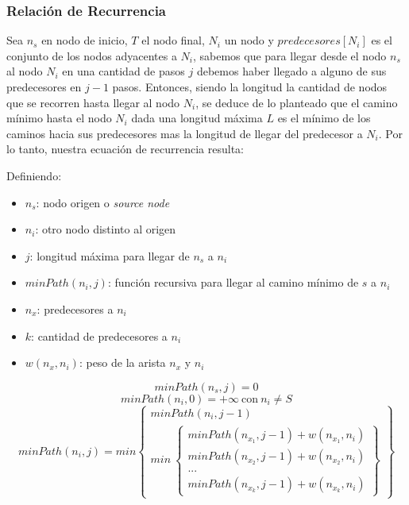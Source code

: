\documentclass[titlepage,a4paper]{article}
\begin{document}
\subsubsection{Relación de Recurrencia}
\label{sec:org209b31c}

Sea \(n_s\) en nodo de inicio, \(T\) el nodo final, \(N_i\) un nodo y \(predecesores[N_i]\) es el
conjunto de los nodos adyacentes a \(N_i\), sabemos que para llegar desde el nodo \(n_s\)
al nodo \(N_i\) en una cantidad de pasos \(j\) debemos haber llegado a alguno de sus
predecesores en \(j-1\) pasos. Entonces, siendo la longitud la cantidad de nodos que
se recorren hasta llegar al nodo \(N_i\), se deduce de lo planteado que el camino
mínimo hasta el nodo \(N_i\) dada una longitud máxima \(L\) es el mínimo de los caminos
hacia sus predecesores mas la longitud de llegar del predecesor a \(N_i\). Por lo
tanto, nuestra ecuación de recurrencia resulta:

Definiendo:
\begin{itemize}
\item \(n_s\): nodo origen o \emph{source node}
\item \(n_i\): otro nodo distinto al origen
\item \(j\): longitud máxima para llegar de \(n_s\) a \(n_i\)
\item \(minPath(n_i, j)\): función recursiva para llegar al camino mínimo de \(s\) a \(n_i\)
\item \(n_x\): predecesores a \(n_i\)
\item \(k\): cantidad de predecesores a \(n_i\)
\item \(w(n_x,n_i)\): peso de la arista \(n_x\) y \(n_i\)
\end{itemize}

$$minPath(n_s, j) = 0$$
$$minPath(n_i, 0) = +\infty\ \text{con}\ n_i \neq S$$
$$
minPath(n_i, j) = min \left\{\begin{array}{lcc}
                        minPath(n_i, j-1) \\
                        min\ \left\{\begin{array}{lcc}
                               minPath(n_x_1, j-1) + w(n_x_1,n_i) \\
                               minPath(n_x_2, j-1) + w(n_x_2,n_i) \\
                               ... \\
                               minPath(n_x_k, j-1) + w(n_x_k,n_i)
                             \end{array}\right\}
                      \end{array}\right\}
$$
\end{document}

